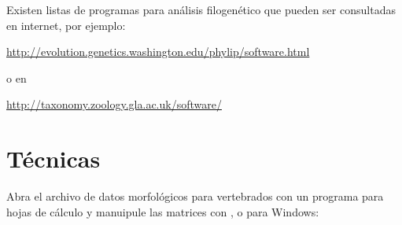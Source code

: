 Existen listas de programas para an\'alisis filogen\'etico que pueden ser consultadas en internet, por ejemplo:


\url{http://evolution.genetics.washington.edu/phylip/software.html}
 
o en 

\url{http://taxonomy.zoology.gla.ac.uk/software/}

\section*{T\'ecnicas}

Abra el archivo de datos morfol\'ogicos para vertebrados  con un programa para hojas de c\'alculo y manuipule las matrices con ,  o  para Windows:

